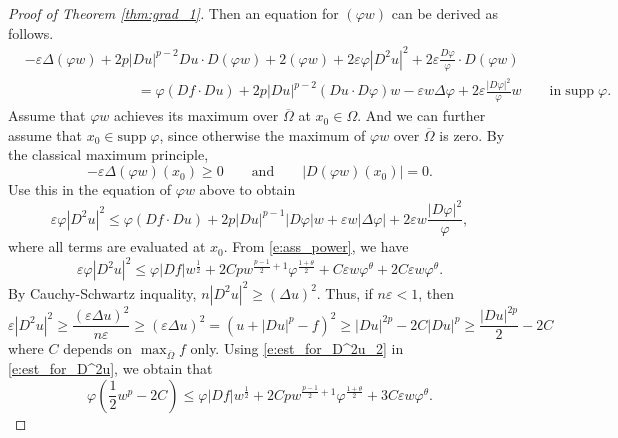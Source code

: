 \documentclass[12pt,reqno]{amsart}
\numberwithin{figure}{section}
\theoremstyle{plain}
\theoremstyle{remark}
\numberwithin{equation}{section}
\begin{document}
\begin{appendices}
\begin{proof}[Proof of Theorem \ref{thm:grad_1}]
Then an equation for $(\varphi w)$ can be derived as follows.
\begin{align*}
    &-\varepsilon \Delta (\varphi w) + 2 p|D u|^{p-2}D u \cdot D (\varphi w) + 2  (\varphi w) + 2 \varepsilon \varphi|D^2u|^2 + 2\varepsilon \frac{D \varphi}{\varphi}\cdot D (\varphi w) \\
    &\qquad\qquad\qquad\qquad = \varphi(D f\cdot D u) + 2 p|D u|^{p-2}(D u\cdot D \varphi)w -\varepsilon w \Delta \varphi + 2\varepsilon \frac{|D \varphi|^2}{\varphi}w
    \qquad\text{in}\;\mathrm{supp}\;\varphi.
\end{align*}
Assume that $\varphi w$ achieves its maximum over $\overline{\Omega}$ at $x_0\in \Omega$. And we can further assume that $x_0\in \mathrm{supp}\;\varphi$, since otherwise the maximum of $\varphi w$ over $\overline{\Omega}$ is zero. By the classical maximum principle, 
\begin{equation*}
    -\varepsilon \Delta(\varphi w)(x_0)\geq 0 \qquad\text{and}\qquad |D(\varphi w)(x_0)| = 0.
\end{equation*}
Use this in the equation of $\varphi w$ above to obtain
\begin{equation*}
    \varepsilon \varphi|D^2u|^2 \leq  \varphi (Df\cdot Du)+ 2 p|Du|^{p-1} |D\varphi|w + \varepsilon w |\Delta\varphi|  + 2\varepsilon  w\frac{|D\varphi|^2}{\varphi},
\end{equation*}
 where all terms are evaluated at $x_0$. From \eqref{e:ass_power}, we have
\begin{equation}\label{e:est_for_D^2u}
    \varepsilon \varphi|D^2u|^2 \leq  \varphi |Df|w^{\frac{1}{2}}+ 2 Cp w^{\frac{p-1}{2}+1} \varphi^{\frac{1+\theta}{2}} + C\varepsilon w \varphi^{\theta} + 2C\varepsilon  w\varphi^\theta.
\end{equation}
By Cauchy-Schwartz inquality, $n|D^2u|^2\geq (\Delta u)^2$. Thus, if $n\varepsilon < 1$, then
\begin{equation}\label{e:est_for_D^2u_2}
    \varepsilon |D^2u|^2 \geq \frac{(\varepsilon \Delta u)^2}{n\varepsilon} \geq (\varepsilon \Delta u)^2 = \left(  u + |Du|^p - f\right)^2 \geq |Du|^{2p} - 2C|Du|^p \geq \frac{|Du|^{2p}}{2} - 2C
\end{equation}
where $C$ depends on $\max_{\overline{\Omega}}f$ only. Using \eqref{e:est_for_D^2u_2} in \eqref{e:est_for_D^2u}, we obtain that
\begin{equation*}
    \varphi\left(\frac{1}{2}w^p - 2C\right) \leq \varphi |Df|w^{\frac{1}{2}}+ 2 Cp w^{\frac{p-1}{2}+1} \varphi^{\frac{1+\theta}{2}} + 3C\varepsilon w \varphi^{\theta}.

\end{equation*}
\end{proof}
\end{appendices}
\end{document}
